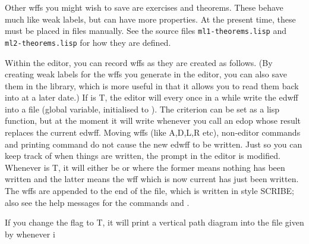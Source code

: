 Other wffs you might wish to save are exercises and theorems.  These
behave much like weak labels, but can have more properties.  At the
present time, these must be placed in files manually.  See the source
files {\tt ml1-theorems.lisp} and {\tt ml2-theorems.lisp} for how they
are defined.

Within the editor, you can record wffs as they are created as follows.
(By creating weak labels for the wffs you generate in the editor, you can
also save them in the library, which is more useful in that it allows you
to read them back into {\TPS} at a later date.)
If  is T, the editor will every once in a while
write the edwff into a file  (global variable,
initialised to ).  The criterion can be set as a lisp function, but at
the moment it will write whenever you call an edop whose result replaces
the current edwff.  Moving wffs (like A,D,L,R etc), non-editor commands
and printing command do not cause the
new edwff to be written.  Just so you can keep track of when things
are written, the prompt in the editor is modified.  Whenever
 is T, it will either be
{\tt <-Edn>} or {\tt <+Edn>}
where the former means nothing has been written and the latter means the wff
which is now current has just been written. The wffs are appended to the end of
the file, which is written in style SCRIBE; also see the help messages
for the commands  and .

If you change the flag  to T, it will print a
vertical path diagram into the file given by  whenever
i